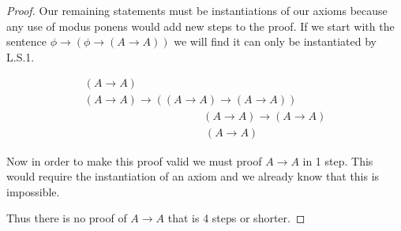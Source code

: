 \documentclass{article}
\begin{document}
\begin{proof}
Our remaining statements must be instantiations of our axioms because any use of modus ponens would add new steps to the proof.
If we start with the sentence $\phi \rightarrow (\phi \rightarrow (A \rightarrow A))$ we will find it can only be instantiated by L.S.1.

\begin{gather*}
(A\rightarrow A) \tag{$\gamma$}\\
(A\rightarrow A) \rightarrow ((A\rightarrow A) \rightarrow (A \rightarrow A)) \tag*{L.S.1 ($\delta$)}\\
\phantom{\text{Modus Ponens ($\gamma$, $\delta$) ($\beta$)}} (A\rightarrow A) \rightarrow (A \rightarrow A) \tag*{Modus Ponens ($\gamma$, $\delta$) ($\beta$)} \\
\phantom{\text{Modus Ponens ($\gamma$, $\beta$) ($\alpha$)}} (A \rightarrow A) \tag*{Modus Ponens ($\gamma$, $\beta$) ($\alpha$)}
\end{gather*}

Now in order to make this proof valid we must proof $A \rightarrow A$ in 1 step.
This would require the instantiation of an axiom and we already know that this is impossible.

Thus there is no proof of $A \rightarrow A$ that is 4 steps or shorter.
\end{proof}
\end{document}
